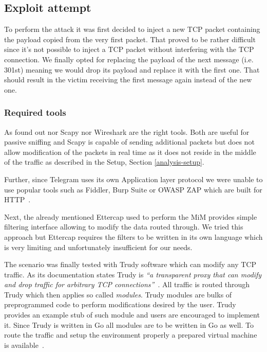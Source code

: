 \documentclass[thesis=M,english]{FITthesis}[2012/10/20]
\begin{document}
\subsection{Exploit attempt}

To perform the attack it was first decided to inject a new TCP packet containing the payload copied from the very first packet. That proved to be rather difficult since it's not possible to inject a TCP packet without interfering with the TCP connection. We finally opted for replacing the payload of the next message (i.e. 301st) meaning we would drop its payload and replace it with the first one. That should result in the victim receiving the first message again instead of the new one.

\subsubsection{Required tools}

As found out nor Scapy nor Wireshark are the right tools. Both are useful for passive sniffing and Scapy is capable of sending additional packets but does not allow modification of the packets in real time as it does not reside in the middle of the traffic as described in the Setup, Section \ref{analysis-setup}.

Further, since Telegram uses its own Application layer protocol we were unable to use popular tools such as Fiddler, Burp Suite or OWASP ZAP which are built for HTTP~\cite{fiddler-homepage, burp-homepage}.

Next, the already mentioned Ettercap used to perform the MiM provides simple filtering interface allowing to modify the data routed through. We tried this approach but Ettercap requires the filters to be written in its own language which is very limiting and unfortunately insufficient for our needs.

The scenario was finally tested with Trudy software which can modify any TCP traffic. As its documentation states Trudy is \emph{``a transparent proxy that can modify and drop traffic for arbitrary TCP connections''}~\cite{github-trudy}. All traffic is routed through Trudy which then applies so called \emph{modules}. Trudy modules are bulks of preprogrammed code to perform modifications desired by the user. Trudy provides an example stub of such module and users are encouraged to implement it. Since Trudy is written in Go all modules are to be written in Go as well. To route the traffic and setup the environment properly a prepared virtual machine is available~\cite{github-trudy-vm}.
\end{document}
